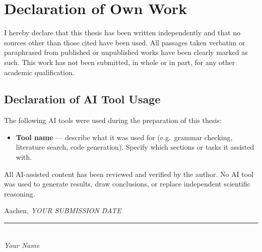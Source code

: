 \ifmasterthesis
\else\ifbachelorthesis
\else

\chapter*{Declaration of Own Work}

I hereby declare that this thesis has been written independently and that no sources other than those cited have been used. All passages taken verbatim or paraphrased from published or unpublished works have been clearly marked as such. This work has not been submitted, in whole or in part, for any other academic qualification.

\fi\fi

\section*{Declaration of AI Tool Usage}

The following AI tools were used during the preparation of this thesis:

\begin{itemize}
  \item \textbf{Tool name} — describe what it was used for (e.g.\ grammar checking, literature search, code generation). Specify which sections or tasks it assisted with.
\end{itemize}

\noindent
All AI-assisted content has been reviewed and verified by the author. No AI tool was used to generate results, draw conclusions, or replace independent scientific reasoning.

\vspace{2cm}

\noindent
Aachen, \textit{YOUR SUBMISSION DATE}

\vspace{1.5cm}

\noindent
\rule{0.4\textwidth}{0.4pt}\\
\textit{Your Name}
